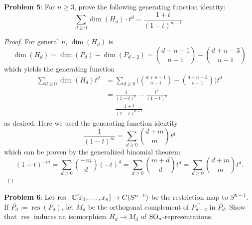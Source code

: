 \documentclass{amsart}
\DeclareMathOperator{\res}{res}
\begin{document}
	\newpage 
	\noindent \textbf{Problem 5}: For $n\geq 3$, prove the following generating function identity:
	$$
	\sum_{d\geq 0} \dim (H_d) \cdot t^d = \frac{1+t}{(1-t)^{n-1}}.
	$$
	\begin{proof}
		For general $n$, $\dim(H_d)$ is 
		$$
		\dim(H_d) = \dim(P_d) - \dim(P_{d-2}) = {d+n-1 \choose n-1} - {d + n - 3 \choose n - 1}
		$$
		which yields the generating function
		\begin{align*}
			\sum_{d\geq 0} \dim(H_d) t^d &= \sum_{d\geq 0} \bigg({d+n-1 \choose n-1} - {d + n - 3 \choose n - 1}\bigg) t^d\\
			&= \frac{1}{(1-t)^{n}} - \frac{t^2}{(1-t)^{n}} \\
			&= \frac{1+t}{(1-t)^{n-1}}
		\end{align*}
		as desired. Here we used the generating function identity
		$$
		\frac{1}{(1-t)^m} = \sum_{d\geq 0} {d + m \choose m} t^d
		$$
		which can be proven by the generalized binomial theorem:
		$$
		(1-t)^{-m} = \sum_{d\geq 0}{-m\choose d} (-t)^d = \sum_{d\geq 0} {m+d \choose d} t^d = \sum_{d\geq 0} {d+m \choose m} t^d.
		$$
	\end{proof}
	
	\newpage
	\noindent \textbf{Problem 6}: Let $\res:\C[x_1,\dots,x_n]\to C(S^{n-1})$ be the restriction map to $S^{n-1}$. If $\overline{P_d}:=\res(P_d)$, let $M_d$ be the orthogonal complement of $\overline{P_{d-2}}$ in $\overline{P_{d}}$. Show that $\res$ induces an isomorphism $H_d\to M_d$ of $\operatorname{SO}_n$-representations.
	
\end{document}
